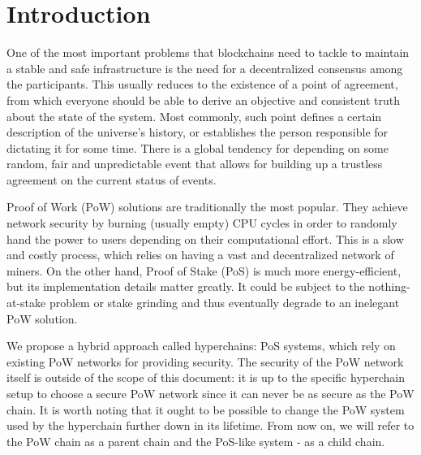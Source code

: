 \section{Introduction}

One of the most important problems that blockchains need to tackle to
maintain a stable and safe infrastructure is the need for a decentralized
consensus among the participants. This usually reduces to the existence of a
point of agreement, from which everyone should be able to derive an objective
and consistent truth about the state of the system. Most commonly,
such point defines a certain description of the universe's history, or establishes
the person responsible for dictating it for some time. There is a
global tendency for depending on some random, fair and unpredictable event that
allows for building up a trustless agreement on the current status of events.

Proof of Work (PoW) solutions are traditionally the most popular.
They achieve network security by burning (usually empty) CPU cycles in order to
randomly hand the power to users depending on their computational effort.
This is a slow and costly process, which relies on having
a vast and decentralized network of miners. On the other hand, Proof of Stake (PoS)
is much more energy-efficient, but its implementation details matter
greatly. It could be subject to the nothing-at-stake problem or stake grinding and
thus eventually degrade to an inelegant PoW solution.

We propose a hybrid approach called hyperchains: PoS systems, which
rely on existing PoW networks for providing security. The security of the
PoW network itself is outside of the scope of this document: it is up to
the specific hyperchain setup to choose a secure PoW network since it
can never be as secure as the PoW chain. It is worth noting that it ought to
be possible to change the PoW system used by the hyperchain further down
in its lifetime. From now on, we will refer to the PoW chain as a parent chain
and the PoS-like system - as a child chain.

